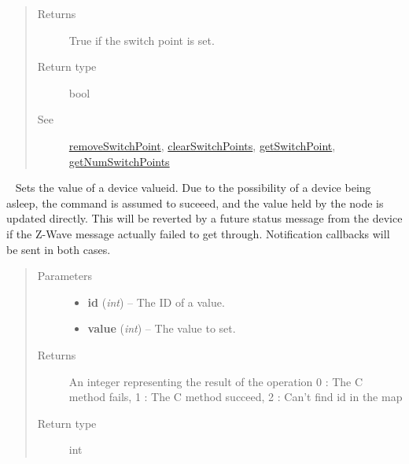 \documentclass[letterpaper,10pt,english]{sphinxmanual}
\begin{document}
\begin{fulllineitems}
\begin{fulllineitems}
\begin{quote}
\begin{description}
\begin{itemize}
\end{itemize}

\item[{Returns}] \leavevmode
True if the switch point is set.

\item[{Return type}] \leavevmode
bool

\item[{See}] \leavevmode
{\hyperref[libopenzwave:removeswitchpoint]{removeSwitchPoint}}, {\hyperref[libopenzwave:clearswitchpoints]{clearSwitchPoints}}, {\hyperref[libopenzwave:getswitchpoint]{getSwitchPoint}}, {\hyperref[libopenzwave:getnumswitchpoints]{getNumSwitchPoints}}

\end{description}\end{quote}

\end{fulllineitems}


\begin{fulllineitems}
\label{libopenzwave:libopenzwave.PyManager.setValue}~\label{libopenzwave:setvalue}
Sets the value of a device valueid.
Due to the possibility of a device being asleep, the command is assumed to suceeed, and the value
held by the node is updated directly.  This will be reverted by a future status message from the device
if the Z-Wave message actually failed to get through.  Notification callbacks will be sent in both cases.
\begin{quote}\begin{description}
\item[{Parameters}] \leavevmode\begin{itemize}
\item {} 
\textbf{id} (\emph{int}) -- The ID of a value.

\item {} 
\textbf{value} (\emph{int}) -- The value to set.

\end{itemize}

\item[{Returns}] \leavevmode
An integer representing the result of the operation  0 : The C method fails, 1 : The C method succeed, 2 : Can't find id in the map

\item[{Return type}] \leavevmode
int

\end{description}\end{quote}


\end{fulllineitems}
\end{fulllineitems}
\end{document}
